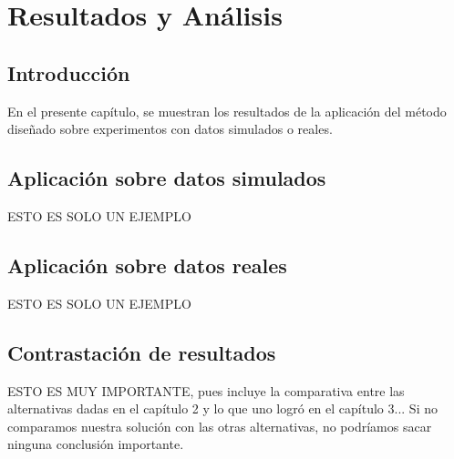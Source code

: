 \chapter{Resultados y Análisis}

\section{Introducción}
En el presente capítulo, se muestran los resultados de la aplicación del método diseñado sobre experimentos con datos simulados o reales.



\section{Aplicación sobre datos simulados}
ESTO ES SOLO UN EJEMPLO


\section{Aplicación sobre datos reales}
ESTO ES SOLO UN EJEMPLO


\section{Contrastación de resultados}
ESTO ES MUY IMPORTANTE, pues incluye la comparativa entre las alternativas dadas en el capítulo 2 y lo que uno logró en el capítulo 3... Si no comparamos nuestra solución con las otras alternativas, no podríamos sacar ninguna conclusión importante.